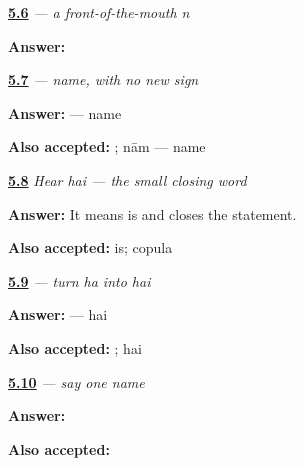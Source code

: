 \noindent\begin{minipage}[t]{\linewidth}
\raggedright
\hyperlink{review-MW-W05-na-choice}{\textbf{5.6}} \emph{ — a front-of-the-mouth \emph{n}}\par
\small \textbf{Answer:} \par
\end{minipage}\par\medskip

\noindent\begin{minipage}[t]{\linewidth}
\raggedright
\hyperlink{review-MW-C05-naam-delayed}{\textbf{5.7}} \emph{ — name, with no new sign}\par
\small \textbf{Answer:}  — name\par
\footnotesize \textbf{Also accepted:} ; nām — name
\end{minipage}\par\medskip

\noindent\begin{minipage}[t]{\linewidth}
\raggedright
\hyperlink{review-MW-C05-hear-hai-meaning}{\textbf{5.8}} \emph{Hear \emph{hai} — the small closing word}\par
\small \textbf{Answer:} It means is and closes the statement.\par
\footnotesize \textbf{Also accepted:} is; copula
\end{minipage}\par\medskip

\noindent\begin{minipage}[t]{\linewidth}
\raggedright
\hyperlink{review-MW-W05-ai-matra-read}{\textbf{5.9}} \emph{ — turn \emph{ha} into \emph{hai}}\par
\small \textbf{Answer:}  — hai\par
\footnotesize \textbf{Also accepted:} ; hai
\end{minipage}\par\medskip

\noindent\begin{minipage}[t]{\linewidth}
\raggedright
\hyperlink{review-MW-C05-answer-dictation}{\textbf{5.10}} \emph{    — say one name}\par
\small \textbf{Answer:}    \par
\footnotesize \textbf{Also accepted:}    
\end{minipage}\par\medskip

